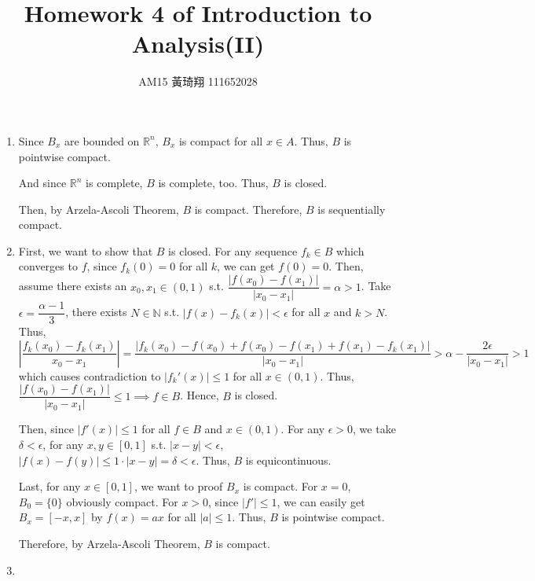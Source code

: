 \documentclass[12pt]{article}
\title{Homework 4 of Introduction to Analysis(II)}
\author{AM15 黃琦翔 111652028}
\begin{document}
\maketitle
\begin{enumerate}
    \item Since $B_x$ are bounded on $\mathbb{R}^n$, $B_x$ is compact for all $x\in A$.
    Thus, $B$ is pointwise compact.

    And since $\mathbb{R}^n$ is complete, $B$ is complete, too.
    Thus, $B$ is closed.

    Then, by Arzela-Ascoli Theorem, $B$ is compact.
    Therefore, $B$ is sequentially compact.

    \item First, we want to show that $B$ is closed.
    For any sequence $f_k \in B$ which converges to $f$, 
    since $f_k(0) = 0$ for all $k$, we can get $f(0) = 0$.
    Then, assume there exists an $x_0, x_1 \in (0, 1)$ s.t. $\dfrac{|f(x_0) - f(x_1)|}{|x_0 - x_1|} = \alpha > 1$.
    Take $\epsilon = \dfrac{\alpha-1}{3}$, there exists $N \in \mathbb{N}$ s.t. $|f(x) - f_k(x)| < \epsilon$ for all $x$ and $k > N$.
    Thus, $|\dfrac{f_k(x_0) - f_k(x_1)}{x_0 - x_1}| = \dfrac{|f_k(x_0) - f(x_0) + f(x_0) - f(x_1) + f(x_1) - f_k(x_1)|}{|x_0 - x_1|} > \alpha - \dfrac{2\epsilon}{|x_0 - x_1|} > 1$ 
    which causes contradiction to $|f_k'(x)| \leq 1$ for all $x\in (0, 1)$.
    Thus, $\dfrac{|f(x_0) - f(x_1)|}{|x_0 - x_1|} \leq 1\implies f\in B$.
    Hence, $B$ is closed.
    
    Then, since $|f'(x)| \leq 1$ for all $f\in B$ and $x\in (0, 1)$.
    For any $\epsilon > 0$, we take $\delta < \epsilon$,
    for any $x, y \in [0, 1]$ s.t. $|x - y| < \epsilon$, 
    $|f(x) - f(y)| \leq 1 \cdot |x-y| = \delta < \epsilon$.
    Thus, $B$ is equicontinuous.

    Last, for any $x \in [0, 1]$, we want to proof $B_x$ is compact.
    For $x = 0$, $B_0 = \{ 0\}$ obviously compact.
    For $x > 0$, since $|f'|\leq 1$, we can easily get $B_x = [-x, x]$ by $f(x) = ax$ for all $|a| \leq 1$.
    Thus, $B$ is pointwise compact.

    Therefore, by Arzela-Ascoli Theorem, $B$ is compact.

    \item 
\end{enumerate}
\end{document}

